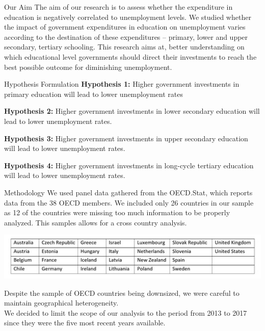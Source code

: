 \documentclass[
  ignorenonframetext,
]{beamer}
\begin{document}
\begin{frame}{Our Aim}
\protect\hypertarget{our-aim}{}
The aim of our research is to assess whether the expenditure in
education is negatively correlated to unemployment levels. We studied
whether the impact of government expenditures in education on
unemployment varies according to the destination of these expenditures
-- primary, lower and upper secondary, tertiary schooling. This research
aims at, better understanding on which educational level governments
should direct their investments to reach the best possible outcome for
diminishing unemployment.
\end{frame}

\begin{frame}{Hypothesis Formulation}
\protect\hypertarget{hypothesis-formulation}{}
\textbf{Hypothesis 1:} Higher government investments in primary
education will lead to lower unemployment rates

\textbf{Hypothesis 2:} Higher government investments in lower secondary
education will lead to lower unemployment rates.

\textbf{Hypothesis 3:} Higher government investments in upper secondary
education will lead to lower unemployment rates.

\textbf{Hypothesis 4:} Higher government investments in long-cycle
tertiary education will lead to lower unemployment rates.
\end{frame}

\begin{frame}{Methodology}
\protect\hypertarget{methodology}{}
We used panel data gathered from the OECD.Stat, which reports data from
the 38 OECD members. We included only 26 countries in our sample as 12
of the countries were missing too much information to be properly
analyzed. This samples allows for a cross country analysis.

\includegraphics{./Table of countries.jpeg}

Despite the sample of OECD countries being downsized, we were careful to
maintain geographical heterogeneity.\\
We decided to limit the scope of our analysis to the period from 2013 to
2017 since they were the five most recent years available.
\end{frame}
\end{document}
